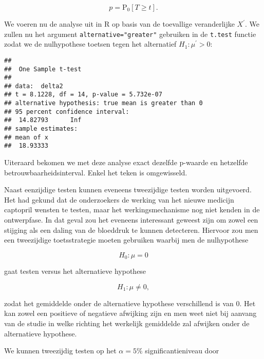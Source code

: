 \documentclass[
  12pt,dutch,coursenotes]{book}
\newenvironment{Shaded}{\begin{snugshade}}{\end{snugshade}}
\newcommand{\DataTypeTok}[1]{\textcolor[rgb]{0.13,0.29,0.53}{#1}}
\newcommand{\KeywordTok}[1]{\textcolor[rgb]{0.13,0.29,0.53}{\textbf{#1}}}
\newcommand{\NormalTok}[1]{#1}
\newcommand{\OperatorTok}[1]{\textcolor[rgb]{0.81,0.36,0.00}{\textbf{#1}}}
\newcommand{\StringTok}[1]{\textcolor[rgb]{0.31,0.60,0.02}{#1}}
\theoremstyle{definition}
\theoremstyle{definition}
\theoremstyle{definition}
\theoremstyle{remark}
\begin{document}
\[p=\text{P}_0\left[T\geq t\right].\]

We voeren nu de analyse uit in R op basis van de toevallige veranderlijke \(X^\prime\). We zullen nu het argument \texttt{alternative="greater"} gebruiken in de \texttt{t.test} functie zodat we de nulhypothese toetsen tegen het alternatief \(H_1: \mu^\prime>0\):

\begin{Shaded}
\end{Shaded}

\begin{verbatim}
## 
##  One Sample t-test
## 
## data:  delta2
## t = 8.1228, df = 14, p-value = 5.732e-07
## alternative hypothesis: true mean is greater than 0
## 95 percent confidence interval:
##  14.82793      Inf
## sample estimates:
## mean of x 
##  18.93333
\end{verbatim}

Uiteraard bekomen we met deze analyse exact dezelfde p-waarde en hetzelfde betrouwbaarheidsinterval. Enkel het teken is omgewisseld.

Naast eenzijdige testen kunnen eveneens tweezijdige testen worden uitgevoerd.
Het had gekund dat de onderzoekers de werking van het nieuwe medicijn captopril wensten te testen, maar het werkingsmechanisme nog niet kenden in de ontwerpfase. In dat geval zou het eveneens interessant geweest zijn om zowel een stijging als een daling van de bloeddruk te kunnen detecteren.
Hiervoor zou men een tweezijdige toetsstrategie moeten gebruiken waarbij men de nulhypothese

\[H_0: \mu=0\]

gaat testen versus het alternatieve hypothese

\[H_1: \mu\neq0,\]

zodat het gemiddelde onder de alternatieve hypothese verschillend is van \(0\). Het kan zowel een positieve of negatieve afwijking zijn en men weet niet bij aanvang van de studie in welke richting het werkelijk gemiddelde zal afwijken onder de alternatieve hypothese.

We kunnen tweezijdig testen op het \(\alpha=5\%\) significantieniveau door
\end{document}
